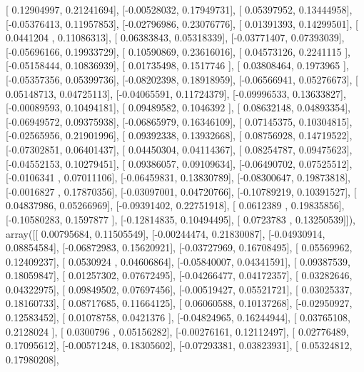 \documentclass{article}
\begin{document}
       [ 0.12904997,  0.21241694],
       [-0.00528032,  0.17949731],
       [ 0.05397952,  0.13444958],
       [-0.05376413,  0.11957853],
       [-0.02796986,  0.23076776],
       [ 0.01391393,  0.14299501],
       [ 0.0441204 ,  0.11086313],
       [ 0.06383843,  0.05318339],
       [-0.03771407,  0.07393039],
       [-0.05696166,  0.19933729],
       [ 0.10590869,  0.23616016],
       [ 0.04573126,  0.2241115 ],
       [-0.05158444,  0.10836939],
       [ 0.01735498,  0.1517746 ],
       [ 0.03808464,  0.1973965 ],
       [-0.05357356,  0.05399736],
       [-0.08202398,  0.18918959],
       [-0.06566941,  0.05276673],
       [ 0.05148713,  0.04725113],
       [-0.04065591,  0.11724379],
       [-0.09996533,  0.13633827],
       [-0.00089593,  0.10494181],
       [ 0.09489582,  0.1046392 ],
       [ 0.08632148,  0.04893354],
       [-0.06949572,  0.09375938],
       [-0.06865979,  0.16346109],
       [ 0.07145375,  0.10304815],
       [-0.02565956,  0.21901996],
       [ 0.09392338,  0.13932668],
       [ 0.08756928,  0.14719522],
       [-0.07302851,  0.06401437],
       [ 0.04450304,  0.04114367],
       [ 0.08254787,  0.09475623],
       [-0.04552153,  0.10279451],
       [ 0.09386057,  0.09109634],
       [-0.06490702,  0.07525512],
       [-0.0106341 ,  0.07011106],
       [-0.06459831,  0.13830789],
       [-0.08300647,  0.19873818],
       [-0.0016827 ,  0.17870356],
       [-0.03097001,  0.04720766],
       [-0.10789219,  0.10391527],
       [ 0.04837986,  0.05266969],
       [-0.09391402,  0.22751918],
       [ 0.0612389 ,  0.19835856],
       [-0.10580283,  0.1597877 ],
       [-0.12814835,  0.10494495],
       [ 0.0723783 ,  0.13250539]]), array([[ 0.00795684,  0.11505549],
       [-0.00244474,  0.21830087],
       [-0.04930914,  0.08854584],
       [-0.06872983,  0.15620921],
       [-0.03727969,  0.16708495],
       [ 0.05569962,  0.12409237],
       [ 0.0530924 ,  0.04606864],
       [-0.05840007,  0.04341591],
       [ 0.09387539,  0.18059847],
       [ 0.01257302,  0.07672495],
       [-0.04266477,  0.04172357],
       [ 0.03282646,  0.04322975],
       [ 0.09849502,  0.07697456],
       [-0.00519427,  0.05521721],
       [ 0.03025337,  0.18160733],
       [ 0.08717685,  0.11664125],
       [ 0.06060588,  0.10137268],
       [-0.02950927,  0.12583452],
       [ 0.01078758,  0.0421376 ],
       [-0.04824965,  0.16244944],
       [ 0.03765108,  0.2128024 ],
       [ 0.0300796 ,  0.05156282],
       [-0.00276161,  0.12112497],
       [ 0.02776489,  0.17095612],
       [-0.00571248,  0.18305602],
       [-0.07293381,  0.03823931],
       [ 0.05324812,  0.17980208],
\end{document}
